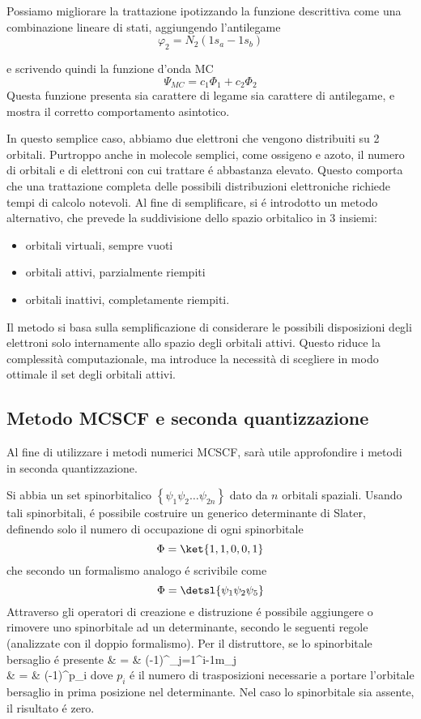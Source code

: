 Possiamo migliorare la trattazione ipotizzando la funzione descrittiva
come una combinazione lineare di stati, aggiungendo l'antilegame
$$
\varphi_2=N_2 \left( 1s_a - 1s_b \right)
$$

e scrivendo quindi la funzione d'onda MC
$$
\Psi_{MC} = c_1 \Phi_1 + c_2 \Phi_2
$$
Questa funzione presenta sia carattere di legame sia carattere di
antilegame, e mostra il corretto comportamento asintotico.

In questo semplice caso, abbiamo due elettroni che vengono distribuiti
su 2 orbitali. Purtroppo anche in molecole semplici, come ossigeno e
azoto, il numero di orbitali e di elettroni con cui trattare \'e abbastanza 
elevato. Questo comporta che una trattazione completa delle possibili 
distribuzioni elettroniche richiede tempi di calcolo notevoli. Al fine 
di semplificare, si \'e introdotto un metodo alternativo, che prevede la 
suddivisione dello spazio orbitalico in 3 insiemi: 
\begin{itemize}
\item orbitali virtuali, sempre vuoti
\item orbitali attivi, parzialmente riempiti
\item orbitali inattivi, completamente riempiti.
\end{itemize}

Il metodo si basa sulla semplificazione di considerare le possibili
disposizioni degli elettroni solo internamente allo spazio degli
orbitali attivi. Questo riduce la complessit\`a computazionale, ma
introduce la necessit\`a di scegliere in modo ottimale il set degli 
orbitali attivi.

\subsection{Metodo MCSCF e seconda quantizzazione}

Al fine di utilizzare i metodi numerici MCSCF, sar\`a utile approfondire
i metodi in seconda quantizzazione.

Si abbia un set spinorbitalico $ \left\{ \psi_1 \psi_2
\ldots \psi_{2n} \right\} $ dato da $n$ orbitali spaziali. Usando
tali spinorbitali, \'e possibile costruire un generico determinante di
Slater, definendo solo il numero di occupazione di ogni spinorbitale
$$
\Phi = \ket{1,1,0,0,1}
$$
che secondo un formalismo analogo \'e scrivibile come
$$
\Phi = \detsl{\psi_1 \psi_2 \psi_5}
$$
Attraverso gli operatori di creazione e distruzione \'e possibile
aggiungere o rimovere uno spinorbitale ad un determinante, secondo le
seguenti regole (analizzate con il doppio formalismo). Per il distruttore, 
se lo spinorbitale bersaglio \'e presente
\beqas
{}  & = &
(-1)^{\sum_{j=1}^{i-1}m_j}  \\
 & = &
(-1)^{p_i} 
\eeqas
dove $p_i$ \'e il numero di trasposizioni necessarie a portare l'orbitale
bersaglio in prima posizione nel determinante.
Nel caso lo spinorbitale sia assente, il risultato \'e zero.


